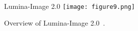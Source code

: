 \begin{refsection}
  \begin{frame}{Lumina-Image 2.0
    }
    \centering
    \texttt{[image: figure9.png]}

    {\scriptsize
    Overview of Lumina-Image 2.0~\parencite{qinLuminaImage20Unified2025}.
    }
    \bottomleftrefs
  \end{frame}
\end{refsection}